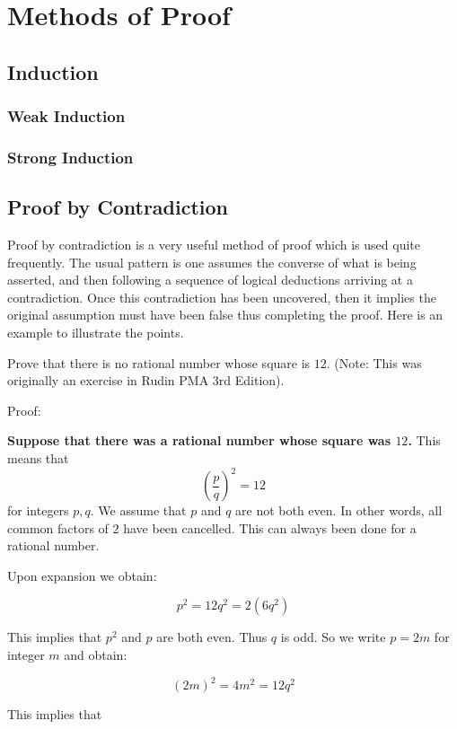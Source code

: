 \chapter{Methods of Proof}

\section{Induction}

\subsection{Weak Induction}

\subsection{Strong Induction}

\section{Proof by Contradiction}

Proof by contradiction is a very useful method of proof which is used quite frequently.  The usual pattern is one assumes the converse of what is being asserted, and then following a sequence of logical deductions arriving at a contradiction.  Once this contradiction has been uncovered, then it implies the original assumption must have been false thus completing the proof.  Here is an example to illustrate the points.


Prove that there is no rational number whose square is $12$.  (Note:  This was originally an exercise in Rudin PMA 3rd Edition).

Proof:

\textbf{Suppose that there was a rational number whose square was $12$.}  This means that
$$ \left(\frac{p}{q}\right)^{2}=12$$ for integers $p,q.$  We assume that $p$ and $q$ are not both even.  In other words, all common factors of $2$ have been cancelled.  This can always been done for a rational number.

Upon expansion we obtain:

$$p^{2}=12q^{2}=2\left(6q^{2}\right)$$

This implies that $p^{2}$ and $p$ are both even.  Thus $q$ is odd.  So we write $p=2m$ for integer $m$ and obtain:

$$\left(2m\right)^{2}=4m^{2}=12q^{2}$$

This implies that 

